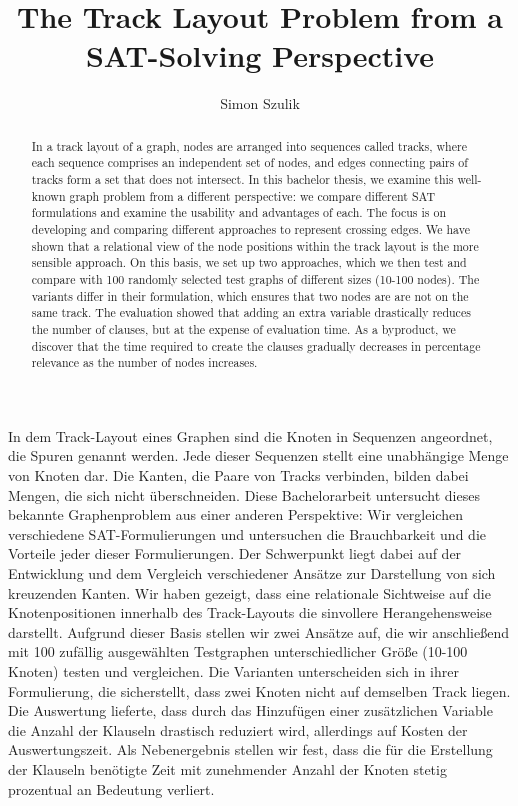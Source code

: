\documentclass[bachelor, english]{algothesis}
\title{The Track Layout Problem from a SAT-Solving Perspective} %
\author{Simon Szulik} %
\begin{document}
\begin{abstract}
In a track layout of a graph, nodes are arranged into sequences called tracks, where each sequence comprises an independent set of nodes, and edges connecting pairs of tracks form a set that does not intersect. In this bachelor thesis, we examine this well-known graph problem from a different perspective: we compare different SAT formulations and examine the usability and advantages of each. The focus is on developing and comparing different approaches to represent crossing edges. We have shown that a relational view of the node positions within the track layout is the more sensible approach. On this basis, we set up two approaches, which we then test and compare with 100 randomly selected test graphs of different sizes (10-100 nodes). The variants differ in their formulation, which ensures that two nodes are  are not on the same track. The evaluation showed that adding an extra variable drastically reduces the number of clauses, but at the expense of evaluation time. As a byproduct, we discover that the time required to create the clauses gradually decreases in percentage relevance as the number of nodes increases.
\end{abstract}

\begin{germanabstract}
In dem Track-Layout eines Graphen sind die Knoten in Sequenzen angeordnet, die Spuren genannt werden. Jede dieser Sequenzen stellt eine unabhängige Menge von Knoten dar. Die Kanten, die Paare von Tracks verbinden, bilden dabei Mengen, die sich nicht überschneiden. Diese Bachelorarbeit untersucht dieses bekannte Graphenproblem aus einer anderen Perspektive: Wir vergleichen verschiedene SAT-Formulierungen und untersuchen die Brauchbarkeit und die Vorteile jeder dieser Formulierungen. Der Schwerpunkt liegt dabei auf der Entwicklung und dem Vergleich verschiedener Ansätze zur Darstellung von sich kreuzenden Kanten. Wir haben gezeigt, dass eine relationale Sichtweise auf die Knotenpositionen innerhalb des Track-Layouts die sinvollere Herangehensweise darstellt. Aufgrund dieser Basis stellen wir zwei Ansätze auf, die wir anschließend mit 100 zufällig ausgewählten Testgraphen unterschiedlicher Größe (10-100 Knoten) testen und vergleichen. Die Varianten unterscheiden sich in ihrer Formulierung, die sicherstellt, dass zwei Knoten nicht auf demselben Track liegen. Die Auswertung lieferte, dass durch das Hinzufügen einer zusätzlichen Variable die Anzahl der Klauseln drastisch reduziert wird, allerdings auf Kosten der Auswertungszeit. Als Nebenergebnis stellen wir fest, dass die für die Erstellung der Klauseln benötigte Zeit mit zunehmender Anzahl der Knoten stetig prozentual an Bedeutung verliert. 
\end{germanabstract}
\end{document}
